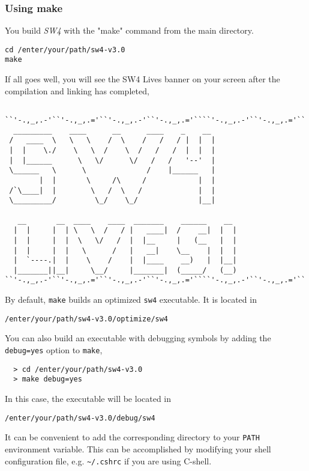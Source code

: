 \documentclass[11pt]{article}
\begin{document}
\subsubsection{Using make}
You build \emph{SW4} with the "make" command from the main directory.
\begin{verbatim}
cd /enter/your/path/sw4-v3.0
make
\end{verbatim}
If all goes well, you will see the SW4 Lives banner on your screen after the compilation and linking
has completed,
{\samepage
\begin{verbatim}
    
``'-.,_,.-'``'-.,_,.='``'-.,_,.-'``'-.,_,.='````'-.,_,.-'``'-.,_,.='``
  _________    ____      __      ____    _    __
 /   ____  \   \   \    /  \    /   /   / |  |  |  
 |  |    \./    \   \  /    \  /   /   /  |  |  |
 |  |______      \   \/      \/   /   /   '--'  |
 \______   \      \              /    |______   |
        |  |       \     /\     /            |  |      
 /`\____|  |        \   /  \   /             |  |      
 \_________/         \_/    \_/              |__|      
                                       
   __       __  ____    ____  _______    ______    __  
  |  |     |  | \   \  /   / |   ____|  /    __|  |  | 
  |  |     |  |  \   \/   /  |  |__     |   (__   |  | 
  |  |     |  |   \      /   |   __|    \__    |  |  | 
  |  `----.|  |    \    /    |  |____    __)   |  |__| 
  |_______||__|     \__/     |_______|  (_____/   (__)
``'-.,_,.-'``'-.,_,.='``'-.,_,.-'``'-.,_,.='````'-.,_,.-'``'-.,_,.='``

\end{verbatim}
}
By default, \verb+make+ builds an optimized \verb+sw4+ executable. It is located in 
\begin{verbatim}
/enter/your/path/sw4-v3.0/optimize/sw4
\end{verbatim}
You can also build an executable with debugging symbols by adding the \verb+debug=yes+ option to \verb+make+,
\begin{verbatim}
  > cd /enter/your/path/sw4-v3.0
  > make debug=yes
\end{verbatim}
In this case, the executable will be located in
\begin{verbatim}
/enter/your/path/sw4-v3.0/debug/sw4
\end{verbatim}
It can be convenient to add the corresponding directory to your \verb+PATH+ environment
variable. This can be accomplished by modifying your shell configuration file, e.g. \verb+~/.cshrc+
if you are using C-shell.
\end{document}
